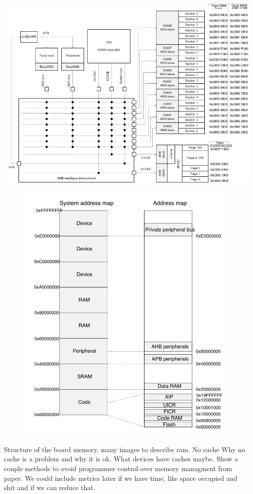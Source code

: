 \documentclass{Configuration_Files/PoliMi3i_thesis}
\begin{document}
\includegraphics[scale=0.3]{memNRF.png}
\begin{figure}[H]
\includegraphics[scale=0.4]{memory2.png}
\centering
\end{figure}


Structure of the board memory, many images to describe ram.
No cache
Why no cache is a problem and why it is ok.
What devices have caches maybe.
Show a couple methods to avoid programmer control over memory managment from paper.
We could include metrics later if we have time, like space occupied and shit and if we can reduce that.
\end{document}
